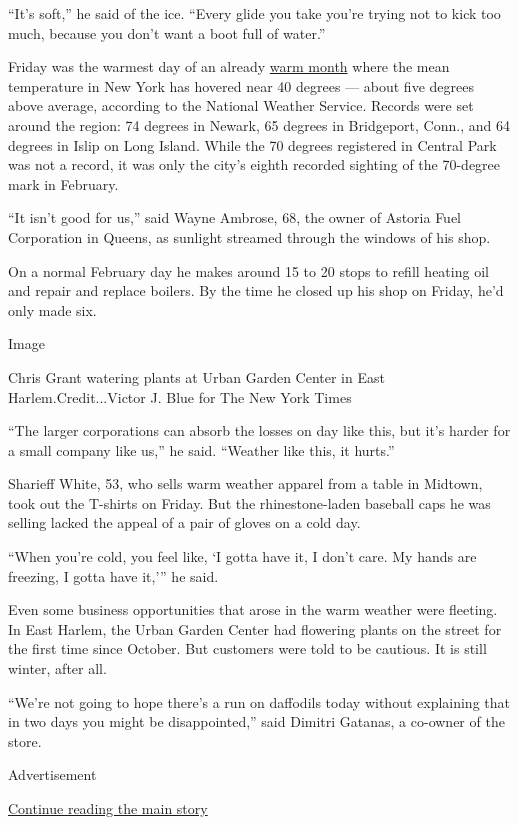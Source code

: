 ``It's soft,'' he said of the ice. ``Every glide you take you're trying
not to kick too much, because you don't want a boot full of water.''

Friday was the warmest day of an already
\href{https://www.nytimes.com/2017/02/08/nyregion/NYC-school-closings-winter-storm.html}{warm
month} where the mean temperature in New York has hovered near 40
degrees --- about five degrees above average, according to the National
Weather Service. Records were set around the region: 74 degrees in
Newark, 65 degrees in Bridgeport, Conn., and 64 degrees in Islip on Long
Island. While the 70 degrees registered in Central Park was not a
record, it was only the city's eighth recorded sighting of the 70-degree
mark in February.

``It isn't good for us,'' said Wayne Ambrose, 68, the owner of Astoria
Fuel Corporation in Queens, as sunlight streamed through the windows of
his shop.

On a normal February day he makes around 15 to 20 stops to refill
heating oil and repair and replace boilers. By the time he closed up his
shop on Friday, he'd only made six.

Image

Chris Grant watering plants at Urban Garden Center in East
Harlem.Credit...Victor J. Blue for The New York Times

``The larger corporations can absorb the losses on day like this, but
it's harder for a small company like us,'' he said. ``Weather like this,
it hurts.''

Sharieff White, 53, who sells warm weather apparel from a table in
Midtown, took out the T-shirts on Friday. But the rhinestone-laden
baseball caps he was selling lacked the appeal of a pair of gloves on a
cold day.

``When you're cold, you feel like, `I gotta have it, I don't care. My
hands are freezing, I gotta have it,''' he said.

Even some business opportunities that arose in the warm weather were
fleeting. In East Harlem, the Urban Garden Center had flowering plants
on the street for the first time since October. But customers were told
to be cautious. It is still winter, after all.

``We're not going to hope there's a run on daffodils today without
explaining that in two days you might be disappointed,'' said Dimitri
Gatanas, a co-owner of the store.

Advertisement

\protect\hyperlink{after-bottom}{Continue reading the main story}

